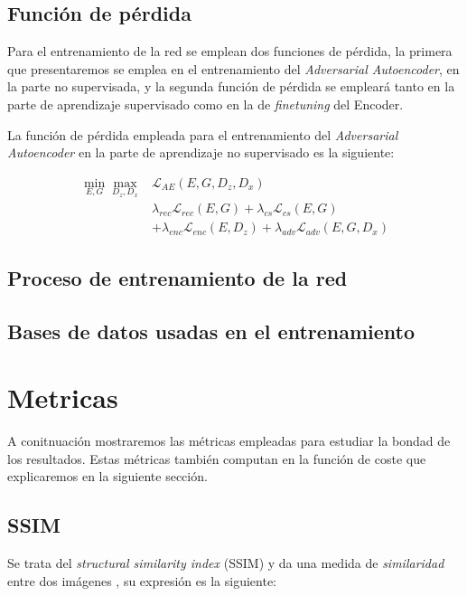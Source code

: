             \subsection{Función de pérdida}

                \noindent Para el entrenamiento de la red se emplean dos funciones de pérdida, la primera que presentaremos se emplea en el entrenamiento del \textit{Adversarial Autoencoder}, en la parte no supervisada, y la segunda función de pérdida se empleará tanto en la parte de aprendizaje supervisado como en la de \textit{finetuning} del Encoder.
        
                \medskip
        
                \noindent La función de pérdida empleada para el entrenamiento del \textit{Adversarial Autoencoder} en la parte de aprendizaje no supervisado es la siguiente: 
                
                \begin{align*}
                    \min_{E,G} \max_{D_z,D_x} & \mathcal{L}_{AE}(E,G,D_z,D_x) \\
                    & \lambda_{rec} \mathcal{L}_{rec}(E,G) + \lambda_{cs}\mathcal{L}_{cs}(E,G) \\
                    & + \lambda_{enc}\mathcal{L}_{enc}(E,D_z)+ \lambda_{adv} \mathcal{L}_{adv}(E,G,D_x)
                \end{align*}
        
            \subsection{Proceso de entrenamiento de la red}
            
            \subsection{Bases de datos usadas en el entrenamiento}

    \section{Metricas}
        
        \noindent A conitnuación mostraremos las métricas empleadas para estudiar la bondad de los resultados. Estas métricas también computan en la función de coste que explicaremos en la siguiente sección. 

        \subsection{SSIM}
            \noindent Se trata del \textit{structural similarity index} (SSIM) y da una medida de \textit{similaridad} entre dos imágenes \cite{wang2004image}, su expresión es la siguiente: 

